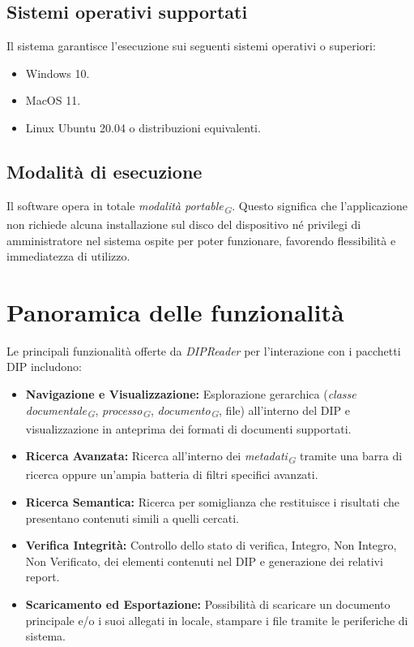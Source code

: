 \documentclass[a4paper,12pt]{article}
\newcommand{\glossario}[1]{\textit{#1}\textsubscript{\textbf{\textit{\textcolor{gray}{G}}}}}
\begin{document}
\subsection{Sistemi operativi supportati}
Il sistema garantisce l'esecuzione sui seguenti sistemi operativi o superiori:
\begin{itemize}
    \item Windows 10.
    \item MacOS 11.
    \item Linux Ubuntu 20.04 o distribuzioni equivalenti.
\end{itemize}

\subsection{Modalità di esecuzione}
Il software opera in totale \glossario{modalità portable}. Questo significa che l'applicazione non richiede alcuna installazione sul disco del dispositivo né privilegi di amministratore nel sistema ospite per poter funzionare, favorendo flessibilità e immediatezza di utilizzo.

\newpage

\section{Panoramica delle funzionalità} \label{panoramica}
Le principali funzionalità offerte da \textit{DIPReader} per l'interazione con i pacchetti DIP includono:
\begin{itemize}
    \item \textbf{Navigazione e Visualizzazione:} Esplorazione gerarchica (\glossario{classe documentale}, \glossario{processo}, \glossario{documento}, file) all'interno del DIP e visualizzazione in anteprima dei formati di documenti supportati.
    \item \textbf{Ricerca Avanzata:} Ricerca all'interno dei \glossario{metadati} tramite una barra di ricerca oppure un'ampia batteria di filtri specifici avanzati. 
    \item \textbf{Ricerca Semantica:} Ricerca per somiglianza che restituisce i risultati che presentano contenuti simili a quelli cercati. 
    \item \textbf{Verifica Integrità:} Controllo dello stato di verifica, Integro, Non Integro, Non Verificato, dei elementi contenuti nel DIP e generazione dei relativi report.
    \item \textbf{Scaricamento ed Esportazione:} Possibilità di scaricare un documento principale e/o i suoi allegati in locale, stampare i file tramite le periferiche di sistema.
    \end{itemize}
\end{document}
